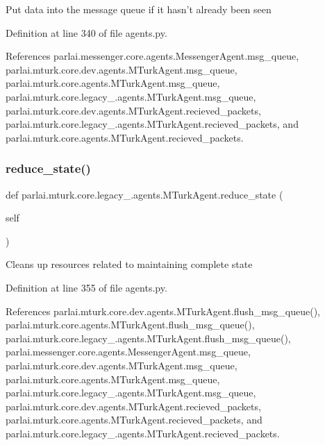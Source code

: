 \begin{DoxyVerb}Put data into the message queue if it hasn't already been seen\end{DoxyVerb}
 

Definition at line 340 of file agents.\+py.



References parlai.\+messenger.\+core.\+agents.\+Messenger\+Agent.\+msg\+\_\+queue, parlai.\+mturk.\+core.\+dev.\+agents.\+M\+Turk\+Agent.\+msg\+\_\+queue, parlai.\+mturk.\+core.\+agents.\+M\+Turk\+Agent.\+msg\+\_\+queue, parlai.\+mturk.\+core.\+legacy\+\_.\+agents.\+M\+Turk\+Agent.\+msg\+\_\+queue, parlai.\+mturk.\+core.\+dev.\+agents.\+M\+Turk\+Agent.\+recieved\+\_\+packets, parlai.\+mturk.\+core.\+legacy\+\_.\+agents.\+M\+Turk\+Agent.\+recieved\+\_\+packets, and parlai.\+mturk.\+core.\+agents.\+M\+Turk\+Agent.\+recieved\+\_\+packets.

\mbox{\label{classparlai_1_1mturk_1_1core_1_1legacy__2018_1_1agents_1_1MTurkAgent_ad6b25298f44461404805c398c3f08ac5}} 
\subsubsection{\texorpdfstring{reduce\+\_\+state()}{reduce\_state()}}
{\footnotesize\ttfamily def parlai.\+mturk.\+core.\+legacy\+\_.\+agents.\+M\+Turk\+Agent.\+reduce\+\_\+state (\begin{DoxyParamCaption}\item[{}]{self }\end{DoxyParamCaption})}

\begin{DoxyVerb}Cleans up resources related to maintaining complete state\end{DoxyVerb}
 

Definition at line 355 of file agents.\+py.



References parlai.\+mturk.\+core.\+dev.\+agents.\+M\+Turk\+Agent.\+flush\+\_\+msg\+\_\+queue(), parlai.\+mturk.\+core.\+agents.\+M\+Turk\+Agent.\+flush\+\_\+msg\+\_\+queue(), parlai.\+mturk.\+core.\+legacy\+\_.\+agents.\+M\+Turk\+Agent.\+flush\+\_\+msg\+\_\+queue(), parlai.\+messenger.\+core.\+agents.\+Messenger\+Agent.\+msg\+\_\+queue, parlai.\+mturk.\+core.\+dev.\+agents.\+M\+Turk\+Agent.\+msg\+\_\+queue, parlai.\+mturk.\+core.\+agents.\+M\+Turk\+Agent.\+msg\+\_\+queue, parlai.\+mturk.\+core.\+legacy\+\_.\+agents.\+M\+Turk\+Agent.\+msg\+\_\+queue, parlai.\+mturk.\+core.\+dev.\+agents.\+M\+Turk\+Agent.\+recieved\+\_\+packets, parlai.\+mturk.\+core.\+agents.\+M\+Turk\+Agent.\+recieved\+\_\+packets, and parlai.\+mturk.\+core.\+legacy\+\_.\+agents.\+M\+Turk\+Agent.\+recieved\+\_\+packets.

